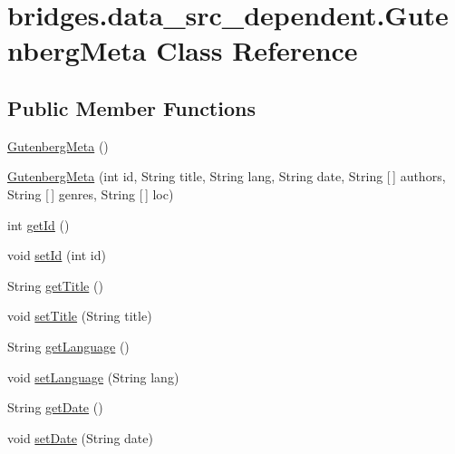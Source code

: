 \hypertarget{classbridges_1_1data__src__dependent_1_1_gutenberg_meta}{}\section{bridges.\+data\+\_\+src\+\_\+dependent.\+Gutenberg\+Meta Class Reference}
\label{classbridges_1_1data__src__dependent_1_1_gutenberg_meta}
\subsection*{Public Member Functions}
\begin{DoxyCompactItemize}
\item 
\hyperlink{classbridges_1_1data__src__dependent_1_1_gutenberg_meta_ab734ffe82b6483d89072791818df0296}{Gutenberg\+Meta} ()
\item 
\hyperlink{classbridges_1_1data__src__dependent_1_1_gutenberg_meta_ac61e113e41c01e428b886b0dbd0c1015}{Gutenberg\+Meta} (int id, String title, String lang, String date, String \mbox{[}$\,$\mbox{]} authors, String \mbox{[}$\,$\mbox{]} genres, String \mbox{[}$\,$\mbox{]} loc)
\item 
int \hyperlink{classbridges_1_1data__src__dependent_1_1_gutenberg_meta_a54cd83b548249a3e41815f9596749f12}{get\+Id} ()
\item 
void \hyperlink{classbridges_1_1data__src__dependent_1_1_gutenberg_meta_aa51a477ffc9bf54f1d5d3fb54afc3718}{set\+Id} (int id)
\item 
String \hyperlink{classbridges_1_1data__src__dependent_1_1_gutenberg_meta_abff73e80da749f3597d61f5a18c2ae8b}{get\+Title} ()
\item 
void \hyperlink{classbridges_1_1data__src__dependent_1_1_gutenberg_meta_aee6e68f3ea6a5a2fa557c8c95f5f7cda}{set\+Title} (String title)
\item 
String \hyperlink{classbridges_1_1data__src__dependent_1_1_gutenberg_meta_ac213a62c78dc156eda5163f70ef6e0f3}{get\+Language} ()
\item 
void \hyperlink{classbridges_1_1data__src__dependent_1_1_gutenberg_meta_ab832299138ecaa465dc59ac9e00e2612}{set\+Language} (String lang)
\item 
String \hyperlink{classbridges_1_1data__src__dependent_1_1_gutenberg_meta_ad7c1fe5ea9aa2dc3db71ac64a35a8cc4}{get\+Date} ()
\item 
void \hyperlink{classbridges_1_1data__src__dependent_1_1_gutenberg_meta_a6668ea9257fd620b7b8f73a720f5dce6}{set\+Date} (String date)

\end{DoxyCompactItemize}
